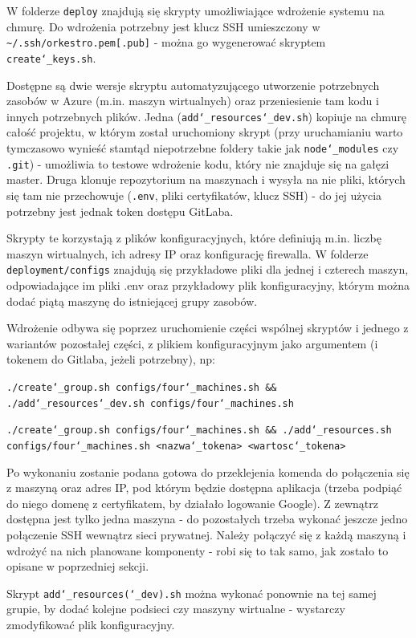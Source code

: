 \documentclass[11pt,a4paper]{article}
\renewcommand{\_}{\char`_}
\begin{document}
W folderze \texttt{deploy} znajdują się skrypty umożliwiające wdrożenie systemu na chmurę. Do wdrożenia potrzebny jest klucz SSH umieszczony w \texttt{\textasciitilde /.ssh/orkestro.pem[.pub]} - można go wygenerować skryptem \texttt{create\_keys.sh}.

Dostępne są dwie wersje skryptu automatyzującego utworzenie potrzebnych zasobów w Azure (m.in. maszyn wirtualnych) oraz przeniesienie tam kodu i innych potrzebnych plików. Jedna (\texttt{add\_resources\_dev.sh}) kopiuje na chmurę całość projektu, w którym został uruchomiony skrypt (przy uruchamianiu warto tymczasowo wynieść stamtąd niepotrzebne foldery takie jak \texttt{node\_modules} czy \texttt{.git}) - umożliwia to testowe wdrożenie kodu, który nie znajduje się na gałęzi master. Druga klonuje repozytorium na maszynach i wysyła na nie pliki, których się tam nie przechowuje (\texttt{.env}, pliki certyfikatów, klucz SSH) - do jej użycia potrzebny jest jednak token dostępu GitLaba.

Skrypty te korzystają z plików konfiguracyjnych, które definiują m.in. liczbę maszyn wirtualnych, ich adresy IP oraz konfigurację firewalla. W folderze \texttt{deployment/configs} znajdują się przykładowe pliki dla jednej i czterech maszyn, odpowiadające im pliki .env oraz przykładowy plik konfiguracyjny, którym można dodać piątą maszynę do istniejącej grupy zasobów.

Wdrożenie odbywa się poprzez uruchomienie części wspólnej skryptów i jednego z wariantów pozostałej części, z plikiem konfiguracyjnym jako argumentem (i tokenem do Gitlaba, jeżeli potrzebny), np: 

\texttt{./create\_group.sh configs/four\_machines.sh \&\& ./add\_resources\_dev.sh configs/four\_machines.sh}

\texttt{./create\_group.sh configs/four\_machines.sh \&\& ./add\_resources.sh configs/four\_machines.sh <nazwa\_tokena> <wartosc\_tokena>}

Po wykonaniu zostanie podana gotowa do przeklejenia komenda do połączenia się z maszyną oraz adres IP, pod którym będzie dostępna aplikacja (trzeba podpiąć do niego domenę z certyfikatem, by działało logowanie Google). Z zewnątrz dostępna jest tylko jedna maszyna - do pozostałych trzeba wykonać jeszcze jedno połączenie SSH wewnątrz sieci prywatnej. Należy połączyć się z każdą maszyną i wdrożyć na nich planowane komponenty - robi się to tak samo, jak zostało to opisane w poprzedniej sekcji.

Skrypt \texttt{add\_resources(\_dev).sh} można wykonać ponownie na tej samej grupie, by dodać kolejne podsieci czy maszyny wirtualne - wystarczy zmodyfikować plik konfiguracyjny.
\end{document}
